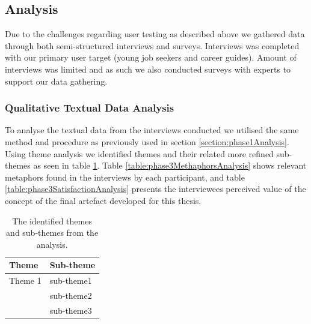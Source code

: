 






\subsection{Analysis}
Due to the challenges regarding user testing as described above we gathered data through both semi-structured interviews and surveys. Interviews was completed with our primary user target (young job seekers and career guides). Amount of interviews was limited and as such we also conducted surveys with experts to support our data gathering.      


\subsubsection{Qualitative Textual Data Analysis}
To analyse the textual data from the interviews conducted we utilised the same method and procedure as previously used in section \ref{section:phase1Analysis}. Using theme analysis we identified themes and their related more refined sub-themes as seen in table \ref{table:phase3ThemeAnalysis}. Table \ref{table:phase3MethaphorsAnalysis} shows relevant metaphors found in the interviews by each participant, and table \ref{table:phase3SatisfactionAnalysis} presents the interviewees perceived value of the concept of the final artefact developed for this thesis.


\begin{table}[H]
      \centering
        \begin{tabular}{ll}
        \toprule
        Theme & Sub-theme \\
        \midrule
       Theme 1 & sub-theme1\\
        & sub-theme2 \\\vspace{0.2cm}
        & sub-theme3 \\
       
        \bottomrule
        \end{tabular}
        \caption{The identified themes and sub-themes from the analysis.}
        \label{table:phase3ThemeAnalysis}
\end{table}






